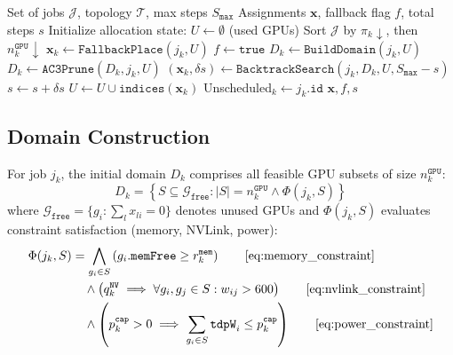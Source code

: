\documentclass[11pt, twoside]{article}
\begin{document}
\begin{algorithm}[h]
\caption{Multi-Constrained GPU Placement with Arc Consistency Pruning}
\label{alg:constraint_schedule}
\begin{algorithmic}[1]
\Require Set of jobs $\mathcal{J}$, topology $\mathcal{T}$, max steps $S_{\texttt{max}}$
\Ensure Assignments $\mathbf{x}$, fallback flag $f$, total steps $s$
\State Initialize allocation state: $U \gets \emptyset$ (used GPUs)
\State Sort $\mathcal{J}$ by $\pi_k \downarrow$, then $n_k^{\texttt{GPU}} \downarrow$
        \State $\mathbf{x}_k \gets \texttt{FallbackPlace}(j_k, U)$ 
        \State $f \gets \texttt{true}$
    \Else
        \State $D_k \gets \texttt{BuildDomain}(j_k, U)$ 
        \State $D_k \gets \texttt{AC3Prune}(D_k, j_k, U)$
        \State $(\mathbf{x}_k, \delta s) \gets \texttt{BacktrackSearch}(j_k, D_k, U, S_{\texttt{max}}-s)$
        \State $s \gets s + \delta s$
    \EndIf
        \State $U \gets U \cup \texttt{indices}(\mathbf{x}_k)$
    \Else
        \State Unscheduled$_k \gets j_k.\texttt{id}$
    \EndIf
\EndFor
\Return $\mathbf{x}, f, s$
\end{algorithmic}
\end{algorithm}

\subsection{Domain Construction}

For job $j_k$, the initial domain $D_k$ comprises all feasible GPU subsets of size $n_k^{\texttt{GPU}}$:
\begin{equation}
D_k = \left\{S \subseteq \mathcal{G}_{\texttt{free}} : |S| = n_k^{\texttt{GPU}} \land \Phi(j_k, S)\right\}
\label{eq:domain_def}
\end{equation}
where $\mathcal{G}_{\texttt{free}} = \{g_i : \sum_l x_{li}=0\}$ denotes unused GPUs and $\Phi(j_k,S)$ evaluates constraint satisfaction (memory, NVLink, power):
\begin{align}
\Phi(j_k,S) &= \bigwedge_{g_i \in S} \left(g_i.\texttt{memFree} \geq r_k^{\texttt{mem}}\right) \tag*{\eqref{eq:memory_constraint}} \\
&\quad \land \left(q_k^{\texttt{NV}} \implies \forall g_i,g_j \in S : w_{ij} > 600\right) \tag*{\eqref{eq:nvlink_constraint}} \\
&\quad \land \left(p_k^{\texttt{cap}} > 0 \implies \sum_{g_i \in S} \texttt{tdpW}_i \leq p_k^{\texttt{cap}}\right) \tag*{\eqref{eq:power_constraint}}
\end{align}
\end{document}
